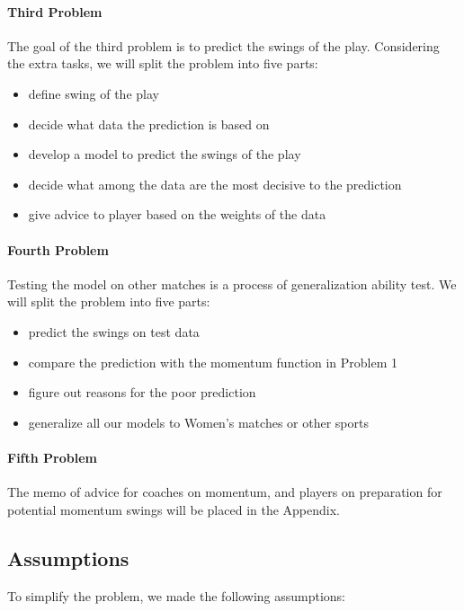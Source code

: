 \paragraph{Third Problem}

The goal of the third problem is to predict the swings of the play.
Considering the extra tasks, we will split the problem into five parts:
\begin{itemize}
    \item define swing of the play
    \item decide what data the prediction is based on
    \item develop a model to predict the swings of the play
    \item decide what among the data are the most decisive to the prediction
    \item give advice to player based on the weights of the data
\end{itemize}

\paragraph{Fourth Problem}

Testing the model on other matches is a process of generalization ability test.
We will split the problem into five parts:
\begin{itemize}
    \item predict the swings on test data
    \item compare the prediction with the momentum function in Problem 1
    \item figure out reasons for the poor prediction
    \item generalize all our models to Women's matches or other sports
\end{itemize}

\paragraph{Fifth Problem}

The memo of advice for coaches on momentum, and players on preparation for potential momentum swings
will be placed in the Appendix.

\subsection{Assumptions}

To simplify the problem, we made the following assumptions:


